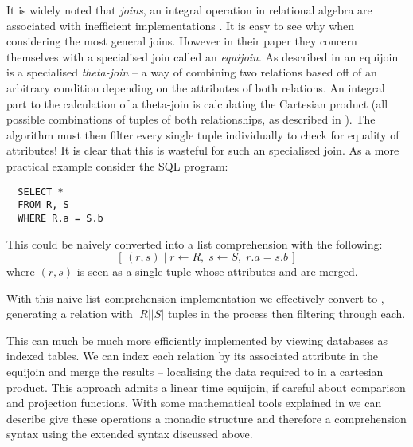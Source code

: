 It is widely noted that \emph{joins}, an integral operation in relational algebra are associated with inefficient implementations \cite{JoinProcessing}. It is easy to see why when considering the most general joins. However in their paper \cite{RelationalAlgebraByWayOfAdjunctions} they concern themselves with a specialised join called an \emph{equijoin}. As described in  an equijoin is a specialised \emph{theta-join} -- a way of combining two relations based off of an arbitrary condition depending on the attributes of both relations. An integral part to the calculation of a theta-join is calculating the Cartesian product (all possible combinations of tuples of both relationships, as described in ). The algorithm must then filter every single tuple individually to check for equality of attributes! It is clear that this is wasteful for such an specialised join. As a more practical example consider the SQL program:
\begin{lstlisting}
  SELECT *
  FROM R, S
  WHERE R.a = S.b
\end{lstlisting}
This could be naively converted into a list comprehension with the following:
\[
  \left[\,(r, s)\;|\;r \leftarrow R,\;s \leftarrow S,\;r.a = s.b\,\right]
\]
where $(r, s)$ is seen as a single tuple whose attributes  and  are merged.

 With this naive list comprehension implementation we effectively convert  to , generating a relation with $|R||S|$ tuples in the process then filtering through each.

 This can much be much more efficiently implemented by viewing databases as indexed tables. We can index each relation by its associated attribute in the equijoin and merge the results -- localising the data required to in a cartesian product. This approach admits a linear time equijoin, if careful about comparison and projection functions. \cite{RelationalAlgebraByWayOfAdjunctions} With some mathematical tools explained in  we can describe give these operations a monadic structure and therefore a comprehension syntax using the extended syntax discussed above.